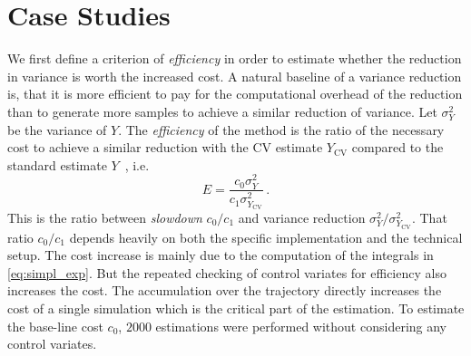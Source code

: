 
\section{Case Studies}\label{sec:cv:study}
We first define a criterion of \emph{efficiency} in order to estimate
whether the reduction in variance is worth the increased cost.
A natural baseline of a variance reduction is, that it is more efficient to pay for
the computational overhead of the reduction than to generate more samples to achieve a similar
reduction of variance.
Let $\sigma_Y^2$ be the variance of $Y$.
The \emph{efficiency} of the method is the ratio of the necessary
cost to achieve a similar reduction with the \ac{CV} estimate $Y_{\text{CV}}$ compared to
the standard estimate $Y$~\parencite{l1994efficiency}, i.e.
\begin{equation}\label{eq:efficiency}
E=\frac{c_0\sigma_Y^2}{c_1\sigma^2_{Y_{\text{CV}}}}\,.
\end{equation}
This is the ratio between \emph{slowdown} $c_0/c_1$ and variance reduction $\sigma_{Y}^2 / \sigma_{Y_{\text{CV}}}^2$.
That ratio $c_0/c_1$ depends heavily on both the specific implementation and the technical setup.
The cost increase is  mainly due to the computation of the integrals in \eqref{eq:simpl_exp}.
But the repeated checking of control  variates for efficiency also increases the cost.
The accumulation over the trajectory directly increases the cost of a single simulation
which is the critical part of the estimation.
To estimate the base-line cost $c_0$, $2000$ estimations were performed without
considering any control variates.

